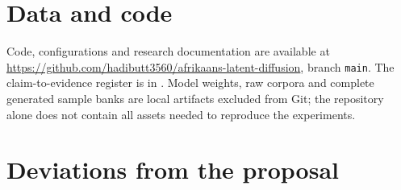 \documentclass[11pt,a4paper]{article}
\begin{document}
\section*{Data and code}
Code, configurations and research documentation are available at \url{https://github.com/hadibutt3560/afrikaans-latent-diffusion}, branch \texttt{main}. The claim-to-evidence register is in . Model weights, raw corpora and complete generated sample banks are local artifacts excluded from Git; the repository alone does not contain all assets needed to reproduce the experiments.




\appendix

\section{Deviations from the proposal}
\label{app:deviations}
\end{document}
